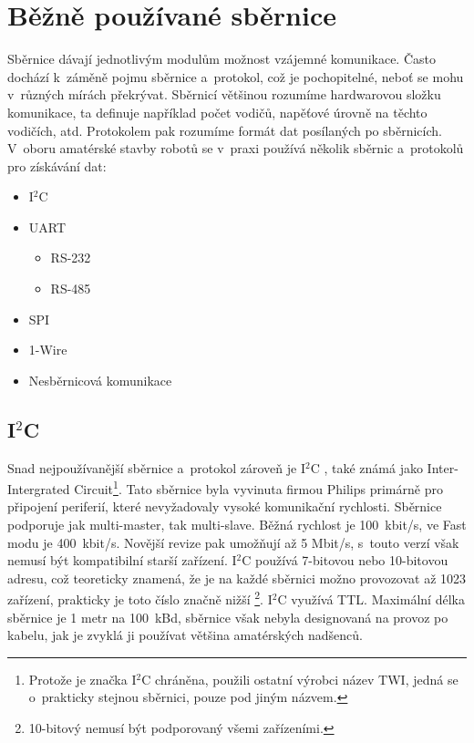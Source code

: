 \chapter{Běžně používané sběrnice}
Sběrnice dávají jednotlivým modulům možnost vzájemné komunikace.
Často dochází k~záměně pojmu sběrnice a~protokol, což je pochopitelné, neboť se mohu v~různých mírách překrývat.
Sběrnicí většinou rozumíme hardwarovou složku komunikace, ta definuje například počet vodičů, napěťové úrovně na těchto vodičích, atd.
Protokolem pak rozumíme formát dat posílaných po sběrnicích.
V~oboru amatérské stavby robotů se v~praxi používá několik sběrnic a~protokolů pro získávání dat:
\begin{itemize}
	\item I$^{2}$C
	\item UART
	      \begin{itemize}
	      	\item RS-232
	      	\item RS-485
	      \end{itemize}
	\item SPI
	\item 1-Wire
	\item Nesběrnicová komunikace
\end{itemize}

\section{I$^{2}$C}
Snad nejpoužívanější sběrnice a~protokol zároveň je I$^{2}$C \cite{nxp:UM10204},
také známá jako Inter-Intergrated Circuit\footnote{ Protože je značka I$^{2}$C chráněna, použili ostatní výrobci název TWI, jedná se o~prakticky stejnou sběrnici, pouze pod jiným názvem.}.
Tato sběrnice byla vyvinuta firmou Philips primárně pro připojení periferií, které nevyžadovaly vysoké komunikační rychlosti.
Sběrnice podporuje jak multi-master, tak multi-slave.
Běžná rychlost je 100~kbit/s, ve Fast modu je 400~kbit/s. Novější revize pak umožňují až 5 Mbit/s, s~touto verzí však nemusí být kompatibilní starší zařízení.
I$^{2}$C používá 7-bitovou nebo 10-bitovou adresu, což teoreticky znamená, že je na každé sběrnici možno provozovat až 1023 zařízení, prakticky je toto číslo značně nižší \footnote{10-bitový nemusí být podporovaný všemi zařízeními.}.
I$^{2}$C využívá TTL.
Maximální délka sběrnice je 1 metr na 100~kBd, sběrnice však nebyla designovaná na provoz po kabelu, jak je zvyklá ji používat většina amatérských nadšenců.


